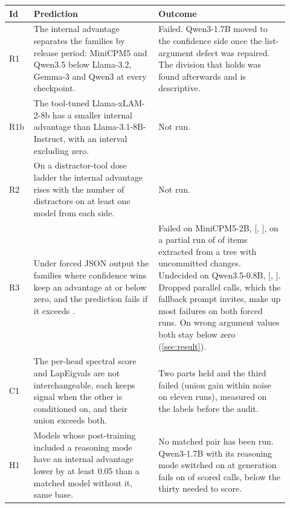 \begin{center}\small
\begin{tabular}{p{0.06\linewidth}p{0.42\linewidth}p{0.44\linewidth}}
\toprule
Id & Prediction & Outcome \\
\midrule
R1 & The internal advantage separates the families by release period: MiniCPM5 and Qwen3.5 below Llama-3.2, Gemma-3 and Qwen3 at every checkpoint. & Failed. Qwen3-1.7B moved to the confidence side once the list-argument defect was repaired. The division that holds was found afterwards and is descriptive. \\
R1b & The tool-tuned Llama-xLAM-2-8b has a smaller internal advantage than Llama-3.1-8B-Instruct, with an interval excluding zero. & Not run. \\
R2 & On a distractor-tool dose ladder the internal advantage rises with the number of distractors on at least one model from each side. & Not run. \\
R3 & Under forced JSON output the families where confidence wins keep an advantage at or below zero, and the prediction fails if it exceeds \rThreeThreshold{}. & Failed on MiniCPM5-2B, \rThreeJsonMiniCpm{} [\rThreeJsonLoMiniCpm{}, \rThreeJsonHiMiniCpm{}], on a partial run of \nJsonItemsMiniCpm{} of \nAllMiniCpmBfcl{} items extracted from a tree with uncommitted changes. Undecided on Qwen3.5-0.8B, \rThreeJsonQwenThreeFive{} [\rThreeJsonLoQwenThreeFive{}, \rThreeJsonHiQwenThreeFive{}]. Dropped parallel calls, which the fallback prompt invites, make up most failures on both forced runs. On wrong argument values both stay below zero (\cref{sec:result}). \\
C1 & The per-head spectral score and LapEigvals are not interchangeable, each keeps signal when the other is conditioned on, and their union exceeds both. & Two parts held and the third failed (union gain within noise on eleven runs), measured on the labels before the audit. \\
H1 & Models whose post-training included a reasoning mode have an internal advantage lower by at least 0.05 than a matched model without it, same base. & No matched pair has been run. Qwen3-1.7B with its reasoning mode switched on at generation fails on \thinkPos{} of \thinkScored{} scored calls, below the thirty needed to score. \\

\end{tabular}
\end{center}
